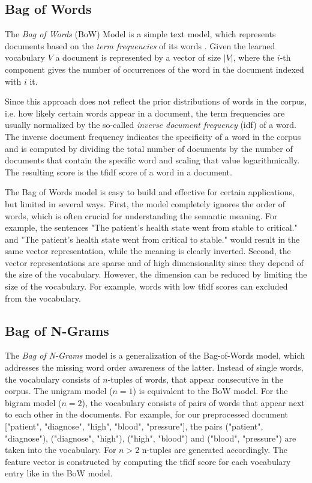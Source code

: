\subsection{Bag of Words}

The \textit{Bag of Words} (BoW) Model is a simple text model, which represents documents based on the \textit{term frequencies} of its words \cite{harris1954distributional}.
Given the learned vocabulary $V$ a document is represented by a vector of size $|V|$, where the $i$-th component gives the number of occurrences of the word in the document indexed with $i$ it.

Since this approach does not reflect the prior distributions of words in the corpus, i.e. how likely certain words appear in a document, the term frequencies are usually normalized by the so-called \textit{inverse document frequency} (idf) of a word.
The inverse document frequency indicates the specificity of a word in the corpus and is computed by dividing the total number of documents by the number of documents that contain the specific word and scaling that value logarithmically.
The resulting score is the tfidf score of a word in a document.


The Bag of Words model is easy to build and effective for certain applications, but limited in several ways.
First, the model completely ignores the order of words, which is often crucial for understanding the semantic meaning. For example, the sentences "The patient's health state went from stable to critical." and "The patient's health state went from critical to stable." would result in the same vector representation, while the meaning is clearly inverted.
Second, the vector representations are sparse and of high dimensionality since they depend of the size of the vocabulary.
However, the dimension can be reduced by limiting the size of the vocabulary. For example, words with low tfidf scores can excluded from the vocabulary.


\subsection{Bag of N-Grams}

The \textit{Bag of N-Grams} model is a generalization of the Bag-of-Words model, which addresses the missing word order awareness of the latter.
Instead of single words, the vocabulary consists of $n$-tuples of words, that appear consecutive in the corpus.
The unigram model ($n=1$) is equivalent to the BoW model.
For the bigram model ($n=2$), the vocabulary consists of pairs of words that appear next to each other in the documents.
For example, for our preprocessed document ["patient", "diagnose", "high", "blood", "pressure"], the pairs ("patient", "diagnose"), ("diagnose", "high"), ("high", "blood") and ("blood", "pressure") are taken into the vocabulary.
For $n>2$ n-tuples are generated accordingly.
The feature vector is constructed by computing the tfidf score for each vocabulary entry like in the BoW model.

